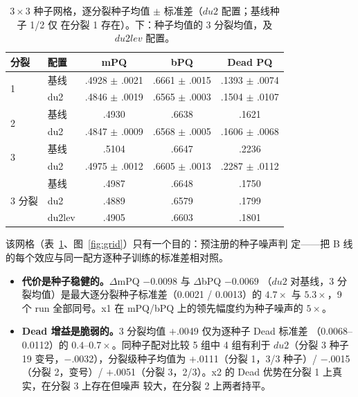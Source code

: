 \documentclass[11pt]{article}
\begin{document}
\begin{table}[t]
\centering\small
\caption{$3{\times}3$ 种子网格，逐分裂种子均值 $\pm$ 标准差（$du2$ 配置；基线种子 1/2 仅
在分裂 1 存在）。下：种子均值的 3 分裂均值，及 $du2lev$ 配置。}
\label{tab:grid}
\begin{tabular}{llccc}
\toprule
分裂 & 配置 & mPQ & bPQ & Dead PQ \\
\midrule
\multirow{2}{*}{1} & 基线 & .4928 $\pm$ .0021 & .6661 $\pm$ .0015 & .1393 $\pm$ .0074 \\
                   & du2  & .4846 $\pm$ .0019 & .6565 $\pm$ .0003 & .1504 $\pm$ .0107 \\
\midrule
\multirow{2}{*}{2} & 基线 & .4930 & .6638 & .1621 \\
                   & du2  & .4847 $\pm$ .0009 & .6568 $\pm$ .0005 & .1606 $\pm$ .0068 \\
\midrule
\multirow{2}{*}{3} & 基线 & .5104 & .6647 & .2236 \\
                   & du2  & .4975 $\pm$ .0012 & .6605 $\pm$ .0013 & .2287 $\pm$ .0112 \\
\midrule
\multirow{3}{*}{3 分裂} & 基线   & .4987 & .6648 & .1750 \\
                        & du2    & .4889 & .6579 & .1799 \\
                        & du2lev & .4905 & .6603 & .1801 \\
\bottomrule
\end{tabular}
\end{table}

该网格（表~\ref{tab:grid}、图~\ref{fig:grid}）只有一个目的：预注册的种子噪声判
定——把 B 线的每个效应与同一配方逐种子训练的标准差相对照。

\begin{itemize}
\item \textbf{代价是种子稳健的。}$\Delta$mPQ $-0.0098$ 与 $\Delta$bPQ $-0.0069$
（$du2$ 对基线，3 分裂均值）是最大逐分裂种子标准差（0.0021 / 0.0013）的 $4.7\times$ 与
$5.3\times$，9 个 run 全部同号。x1 在 mPQ/bPQ 上的领先幅度约为种子噪声的 $5\times$。
\item \textbf{Dead 增益是脆弱的。}3 分裂均值 $+$.0049 仅为逐种子 Dead 标准差
（0.0068--0.0112）的 $0.4$--$0.7\times$。同种子配对比较 5 组中 4 组有利于 $du2$（分裂 3
种子 19 变号，$-$.0032），分裂级种子均值为 $+$.0111（分裂 1，3/3 种子）/ $-$.0015（分裂
2，变号）/ $+$.0051（分裂 3，2/3）。x2 的 Dead 优势在分裂 1 上真实，在分裂 3 上存在但噪声
较大，在分裂 2 上两者持平。
\end{itemize}
\end{document}
